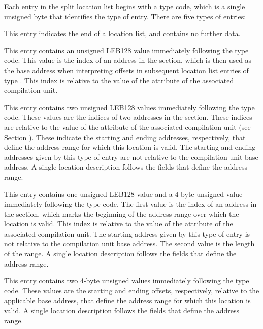 Each entry in the split location list
begins with a type code, which is a single unsigned byte that
identifies the type of entry. There are five types of entries:
\begin{enumerate}
\itembfnl{\DWLLEendoflistentryTARG}
This entry indicates the end of a location list, and
contains no further data.

\itembfnl{\DWLLEbaseaddressselectionentryTARG}
This entry contains an 
unsigned LEB128 value immediately
following the type code. This value is the index of an
address in the \dotdebugaddr{} section, which is then used as
the base address when interpreting offsets in subsequent
location list entries of type \DWLLEoffsetpairentry.
This index is relative to the value of the 
\DWATaddrbase{} attribute of the associated compilation unit.

\itembfnl{\DWLLEstartendentryTARG}
This entry contains two unsigned LEB128
values immediately following the type code. These values are the
indices of two addresses in the \dotdebugaddr{} section.
These indices are relative to the value of the 
\DWATaddrbase{} attribute of the associated compilation unit
(see Section ).
These indicate the starting and ending addresses,
respectively, that define the address range for which
this location is valid. The starting and ending addresses
given by this type of entry are not relative to the
compilation unit base address. A single location
description follows the fields that define the address range.

\itembfnl{\DWLLEstartlengthentryTARG}
This entry contains one unsigned LEB128
value and a 4-byte
unsigned value immediately following the type code. The
first value is the index of an address in the \dotdebugaddr{}
section, which marks the beginning of the address range
over which the location is valid.
This index is relative to the value of the 
\DWATaddrbase{} attribute of the associated compilation unit.
The starting address given by this
type of entry is not relative to the compilation unit
base address. The second value is the
length of the range. A single location
description follows the fields that define the address range.

\itembfnl{\DWLLEoffsetpairentryTARG}
This entry contains two 4-byte unsigned values
immediately following the type code. These values are the
starting and ending offsets, respectively, relative to
the applicable base address, that define the address
range for which this location is valid. A single location
description follows the fields that define the address range.
\end{enumerate}

